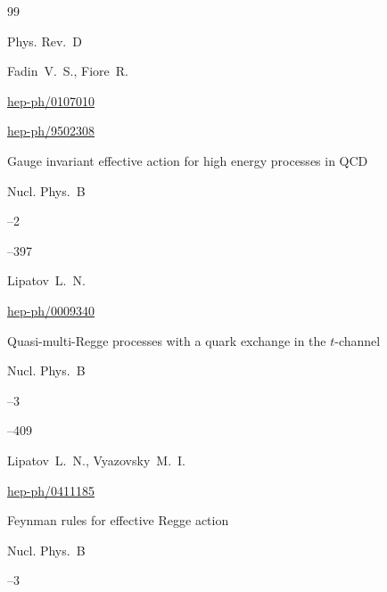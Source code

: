 \begin{thebibliography}{99}

\jour Phys. Rev.~D 



\by Fadin~V.~S., Fiore~R.


\arxiv \href{http://arxiv.org/abs/hep-ph/0107010}{hep-ph/0107010}





\arxiv \href{http://arxiv.org/abs/hep-ph/9502308}{hep-ph/9502308}

\paper Gauge invariant effective action for high energy processes in QCD


\jour Nucl. Phys.~B 


--2 

--397

\by Lipatov~L.~N.







\arxiv \href{http://arxiv.org/abs/hep-ph/0009340}{hep-ph/0009340}

\paper Quasi-multi-Regge processes with a quark exchange in the $t$-channel


\jour Nucl. Phys.~B 


--3 

--409

\by Lipatov~L.~N.,  Vyazovsky~M.~I.







\arxiv \href{http://arxiv.org/abs/hep-ph/0411185}{hep-ph/0411185}

\paper Feynman rules for effective Regge action


\jour Nucl. Phys.~B 


--3 


\end{thebibliography}
